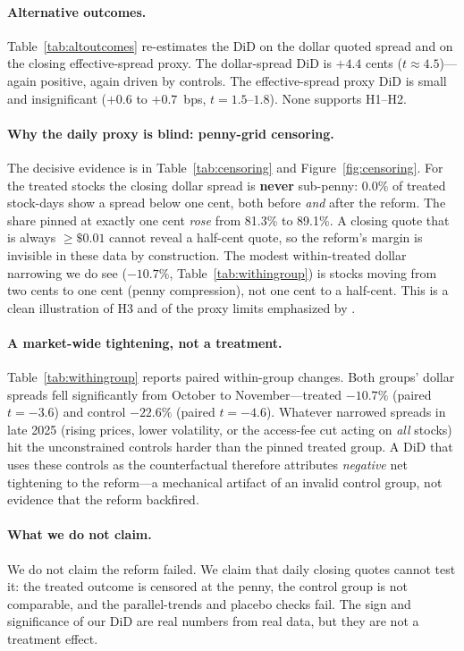 \documentclass[12pt]{article}
\begin{document}
\paragraph{Alternative outcomes.} Table~\ref{tab:altoutcomes} re-estimates the DiD on the
dollar quoted spread and on the closing effective-spread proxy. The dollar-spread DiD is
$+4.4$ cents ($t\approx4.5$)---again positive, again driven by controls. The
effective-spread proxy DiD is small and insignificant ($+0.6$ to $+0.7$~bps,
$t=1.5$--$1.8$). None supports H1--H2.

\paragraph{Why the daily proxy is blind: penny-grid censoring.} The decisive evidence is in
Table~\ref{tab:censoring} and Figure~\ref{fig:censoring}. For the treated stocks the
closing dollar spread is \textbf{never} sub-penny: 0.0\% of treated stock-days show a
spread below one cent, both before \emph{and} after the reform. The share pinned at exactly
one cent \emph{rose} from 81.3\% to 89.1\%. A closing quote that is always $\ge\$0.01$
cannot reveal a half-cent quote, so the reform's margin is invisible in these data by
construction. The modest within-treated dollar narrowing we do see ($-10.7\%$,
Table~\ref{tab:withingroup}) is stocks moving from two cents to one cent (penny
compression), not one cent to a half-cent. This is a clean illustration of H3 and of the
proxy limits emphasized by \citet{holden2014}.

\paragraph{A market-wide tightening, not a treatment.} Table~\ref{tab:withingroup} reports
paired within-group changes. Both groups' dollar spreads fell significantly from October to
November---treated $-10.7\%$ (paired $t=-3.6$) and control $-22.6\%$ (paired $t=-4.6$).
Whatever narrowed spreads in late 2025 (rising prices, lower volatility, or the access-fee
cut acting on \emph{all} stocks) hit the unconstrained controls harder than the pinned
treated group. A DiD that uses these controls as the counterfactual therefore attributes
\emph{negative} net tightening to the reform---a mechanical artifact of an invalid control
group, not evidence that the reform backfired.

\paragraph{What we do not claim.} We do not claim the reform failed. We claim that daily
closing quotes cannot test it: the treated outcome is censored at the penny, the control
group is not comparable, and the parallel-trends and placebo checks fail. The sign and
significance of our DiD are real numbers from real data, but they are not a treatment
effect.
\end{document}
